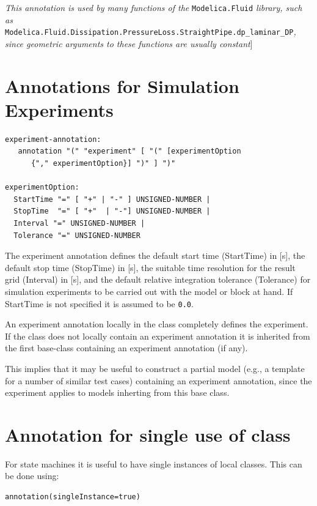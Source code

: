 \emph{This annotation is used by many functions of the} \lstinline!Modelica.Fluid!
\emph{library, such as}\\
\lstinline!Modelica.Fluid.Dissipation.PressureLoss.StraightPipe.dp_laminar_DP!\emph{,
since geometric arguments to these functions are usually constant}{]}

\section{Annotations for Simulation Experiments}
\begin{lstlisting}[language=grammar]
experiment-annotation:
   annotation "(" "experiment" [ "(" [experimentOption
      {"," experimentOption}] ")" ] ")"

experimentOption:
  StartTime "=" [ "+" | "-" ] UNSIGNED-NUMBER |
  StopTime  "=" [ "+"  | "-"] UNSIGNED-NUMBER |
  Interval "=" UNSIGNED-NUMBER |
  Tolerance "=" UNSIGNED-NUMBER
\end{lstlisting}

The experiment annotation defines the default start time (StartTime) in
  {[}s{]}, the default stop time (StopTime) in {[}s{]}, the suitable time
  resolution for the result grid (Interval) in {[}s{]}, and the default
relative integration tolerance (Tolerance) for simulation experiments to
be carried out with the model or block at hand. If StartTime is not specified it is assumed to be \lstinline!0.0!.

An experiment annotation locally in the class completely defines the experiment.
If the class does not locally contain an experiment annotation it is inherited from the first base-class containing
an experiment annotation (if any).
\begin{nonnormative}
This implies that it may be useful to construct a partial model (e.g., a template for a number of similar test cases)
containing an experiment annotation, since the experiment applies to models inherting from this base class.
\end{nonnormative}

\section{Annotation for single use of class}

For state machines it is useful to have single instances of local
classes. This can be done using:
\begin{lstlisting}[language=modelica]
annotation(singleInstance=true)
\end{lstlisting}

